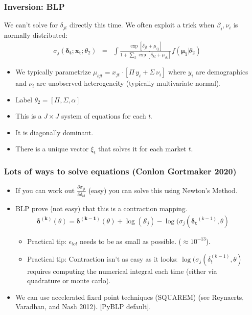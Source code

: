 \begin{frame}
\frametitle{Inversion: BLP}
We can't solve for $\delta_{jt}$ directly this time. We often exploit a trick when $\beta_i,\nu_i$ is normally distributed:
\begin{eqnarray*}
\sigma_j(\boldsymbol{\delta_t}; \mathbf{x_t}; \theta_2) &=& \int \frac{\exp[\delta_{jt} +  \mu_{ij} ]}{1+\sum_k \exp[\delta_{kt} + \mu_{ik} ]} f(\boldsymbol{\mu_i}| \theta_2)
\end{eqnarray*}
 \begin{itemize}
    \item We typically parametrize $\mu_{ijt} = x_{jt} \cdot [\Pi \, y_i + \Sigma \, \nu_{i}]$ where $y_i$ are demographics and $\nu_i$ are unobserved heterogeneity (typically multivariate normal).
    \item Label $\theta_2 = [\Pi, \Sigma, \alpha]$
 \item This is a $J \times J$ system of equations for each $t$.
 \item It is diagonally dominant.
 \item There is a unique vector $\xi_t$ that solves it for each market $t$.
 \end{itemize}
\end{frame}

\begin{frame}
\frametitle{Lots of ways to solve equations (Conlon Gortmaker 2020)}
 \begin{itemize}
     \item If you can work out $\frac{\partial \sigma_{jt}}{\partial \delta_{kt}}$ (easy) you can solve this using Newton's Method. 
 \item BLP prove (not easy) that this is a \alert{contraction mapping}.
\begin{eqnarray*}
    \boldsymbol{\delta^{(k)}}(\theta) = \boldsymbol{\delta^{(k-1)}}(\theta) + \log(\mathcal{S}_{j}) - \log(\sigma_{j}(\boldsymbol{\delta_t}^{(k-1)}, \theta)
\end{eqnarray*}

\begin{itemize} 
  \item Practical tip: $\epsilon_{tol}$ needs to be as small as possible. ($\approx 10^{-13}$).
 \item Practical tip: Contraction isn't as easy as it looks:  $ \log(\sigma_{j}(\delta_t^{(k-1)}, \theta)$ requires computing the numerical integral each time (either via quadrature or monte carlo).
\end{itemize}
\item We can use \alert{accelerated fixed point} techniques (SQUAREM) (see Reynaerts, Varadhan, and Nash 2012). [PyBLP default].
  \end{itemize}
 \end{frame}


